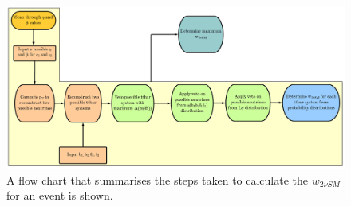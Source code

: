 \begin{figure}[h!]
	\includegraphics[width=1\textwidth]{figures/2vsm_flow.png}
	\centering
	\caption{A flow chart that summarises the steps taken to calculate the $w_{2\nu SM}$ for an event is shown.}
	\label{fig:2vsm-flow}
\end{figure}
